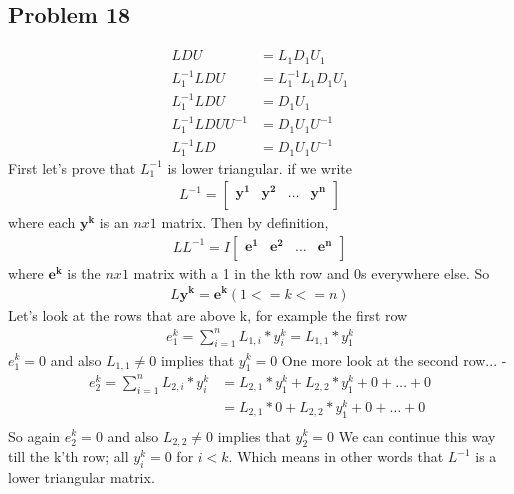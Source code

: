 \documentclass[a4paper,11pt]{article}
\newcommand{\mybf}[1]{\boldsymbol{#1}}
\begin{document}
\subsection*{Problem 18}
\begin{subequations}
\begin{align}
    LDU&=L_1D_1U_1\\
    L_1^{-1}LDU&=L_1^{-1}L_1D_1U_1\\
    L_1^{-1}LDU&=D_1U_1\\
    L_1^{-1}LDUU^{-1}&=D_1U_1U^{-1}\\
    L_1^{-1}LD&=D_1U_1U^{-1}
\end{align}
\end{subequations}
First let's prove that $L_1^{-1}$ is lower triangular. if we write 
\begin{align}
L^{-1} = 
\begin{bmatrix}
\mybf{y^1} & \mybf{y^2} & \dots & \mybf{y^n} \\
\end{bmatrix}
\end{align}
where each $\mybf{y^k}$ is an $nx1$ matrix.
Then by definition, 
\begin{align}
LL^{-1} = I 
\begin{bmatrix}
\mybf{e^1} & \mybf{e^2} & \dots & \mybf{e^n} \\
\end{bmatrix}
\end{align}
where $\mybf{e^k}$ is the $n x 1$ matrix with a 1 in the kth row and 0s everywhere else. 
So 
\begin{align}
L\mybf{y^k} = \mybf{e^k} (1<=k<=n) 
\end{align}
Let's look at the rows that are above k, for example the first row
\begin{align}
e^k_1 = \sum_{i=1}^{n} L_{1,i}*y^k_i = L_{1,1}*y^k_1
\end{align}
$e^k_1=0$ and also $L_{1,1}\ne 0$ implies that $y^k_1=0$
One more look at the second row... - 
\begin{align}
e^k_2 = \sum_{i=1}^{n} L_{2,i}*y^k_i &= L_{2,1}*y^k_1 + L_{2,2}*y^k_1 + 0 + \dots + 0 \\
 &=  L_{2,1}*0 + L_{2,2}*y^k_1 + 0 + \dots + 0 \\
\end{align}
So again
$e^k_2=0$ and also $L_{2,2}\ne 0$ implies that $y^k_2=0$
We can continue this way till the k'th row; all $y^k_i=0$ for $i<k$.
Which means in other words that $L^{-1}$ is a lower triangular matrix.
 
\end{document}
